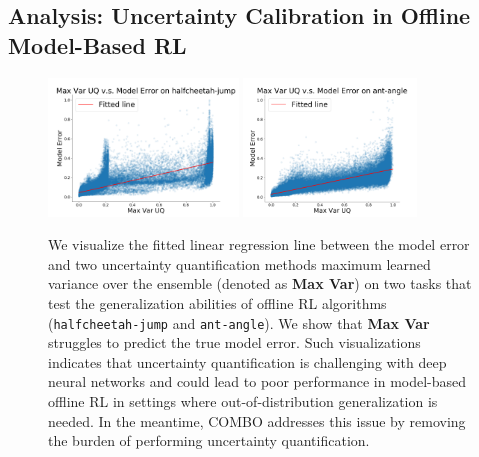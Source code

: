 \subsection{Analysis: Uncertainty Calibration in Offline Model-Based RL}
\label{sec:uq}

\begin{figure}[t]
    \vspace{-0.5cm}
        \centering
        \includegraphics[width=0.45\textwidth]{chapters/combo/halfcheetah_jump_linear_regression_lip_ens_ood.png}
        \includegraphics[width=0.41\textwidth]{chapters/combo/ant_angle_linear_regression_lip_ens_ood.png}
        \vspace{-0.2cm}
        \caption{\footnotesize {We visualize the fitted linear regression line between the model error and two uncertainty quantification methods maximum learned variance over the ensemble (denoted as \textbf{Max Var}) on two tasks that test the generalization abilities of offline RL algorithms (\texttt{halfcheetah-jump} and \texttt{ant-angle}). We show that \textbf{Max Var} struggles to predict the true model error. Such visualizations indicates that uncertainty quantification is challenging with deep neural networks and could lead to poor performance in model-based offline RL in settings where out-of-distribution generalization is needed. In the meantime, COMBO addresses this issue by removing the burden of performing uncertainty quantification.}}
        \label{fig:uq}
        \vspace{-0.4cm}
\end{figure}

